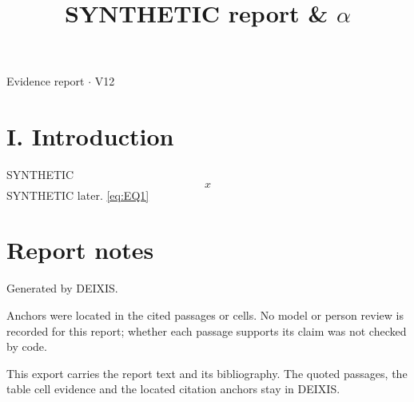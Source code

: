 \documentclass[journal]{IEEEtran}
\begin{document}
\title{SYNTHETIC report \& \ensuremath{\alpha}}

\maketitle

\noindent Evidence report \ensuremath{\cdot} V12

\section*{I. Introduction}

SYNTHETIC
\begin{equation}
\label{eq:EQ1}
x
\end{equation}
\cite{Synth26} SYNTHETIC later. \eqref{eq:EQ1} \cite{Synth26}

\section*{Report notes}

Generated by DEIXIS.

Anchors were located in the cited passages or cells. No model or person review is recorded for this report; whether each passage supports its claim was not checked by code.

This export carries the report text and its bibliography. The quoted passages, the table cell evidence and the located citation anchors stay in DEIXIS.




\end{document}
